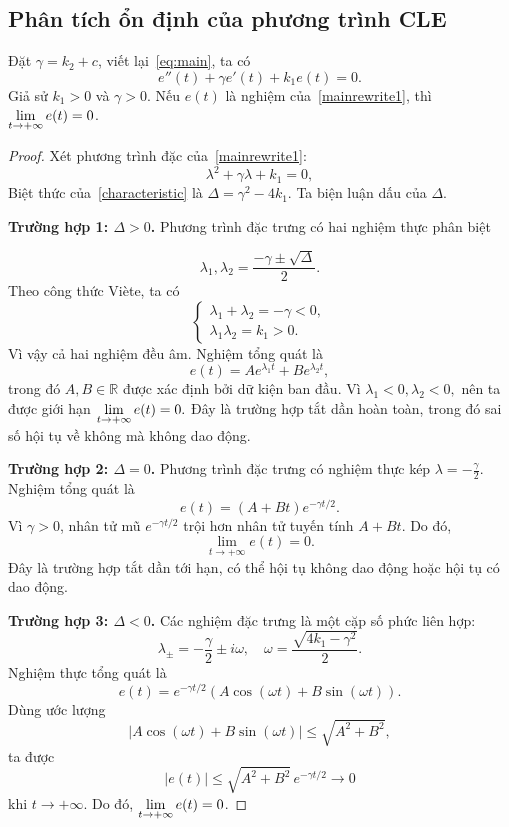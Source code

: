 ﻿\documentclass[12pt]{article}
\begin{document}
\subsection{Phân tích ổn định của phương trình CLE}
\begin{theorem}
  
Đặt $\gamma = k_2 + c$, viết lại~\eqref{eq:main}, ta có
\begin{equation}\label{mainrewrite1}
 e''(t) + \gamma e'(t) + k_1 e(t) = 0.
\end{equation}
Giả sử $k_1 > 0$ và $\gamma > 0$. Nếu $e(t)$ là nghiệm của~\eqref{mainrewrite1}, thì $\displaystyle \lim_{t \to + \infty} e(t) = 0$.
\end{theorem}
\begin{proof} Xét phương trình đặc của~\eqref{mainrewrite1}:
\begin{equation}\label{characteristic}
 \lambda^2 + \gamma\lambda + k_1 = 0,
\end{equation}
Biệt thức của~\eqref{characteristic} là
$\Delta = \gamma^2 - 4k_1.$
Ta biện luận dấu của $\Delta$.

\textbf{Trường hợp 1: $\Delta > 0$.} Phương trình đặc trưng có hai nghiệm thực phân biệt

\[
 \lambda_1,\lambda_2 = \frac{-\gamma \pm \sqrt{\Delta}}{2}.
\]
Theo công thức Viète, ta có
\[
 \begin{cases}
 \lambda_1 + \lambda_2 = -\gamma < 0,\\
 \lambda_1\lambda_2 = k_1 > 0.
 \end{cases}
\]
Vì vậy cả hai nghiệm đều âm. Nghiệm tổng quát là
\[
 e(t) = Ae^{\lambda_1 t} + Be^{\lambda_2 t},
\]
trong đó $A, B \in \mathbb R$ được xác định bởi dữ kiện ban đầu. Vì
$\lambda_1 < 0,\lambda_2 < 0,$ nên ta được giới hạn
$\displaystyle \lim_{t \to + \infty} e(t) = 0.$
Đây là trường hợp tắt dần hoàn toàn, trong đó sai số hội tụ về không mà không dao động.

\textbf{Trường hợp 2: $\Delta = 0$.} Phương trình đặc trưng có nghiệm thực kép
$\lambda = -\frac{\gamma}{2}.$ Nghiệm tổng quát là
\[
 e(t) = (A + Bt)e^{-\gamma t/2}.
\]
Vì $\gamma > 0$, nhân tử mũ $e^{-\gamma t/2}$ trội hơn nhân tử tuyến tính $A + Bt$. Do đó,
\[
 \lim_{t \to + \infty} e(t) = 0.
\]
Đây là trường hợp tắt dần tới hạn, có thể hội tụ không dao động hoặc hội tụ có dao động.

\textbf{Trường hợp 3: $\Delta < 0$.} Các nghiệm đặc trưng là một cặp số phức liên hợp:
\[
 \lambda_{\pm} = -\frac{\gamma}{2} \pm i\omega,\quad \omega = \frac{\sqrt{4k_1 - \gamma^2}}{2}.
\]
Nghiệm thực tổng quát là
\[
 e(t) = e^{-\gamma t/2} \left( A\cos(\omega t) + B\sin(\omega t) \right).
\]
Dùng ước lượng
\[
 \left|A\cos(\omega t) + B\sin(\omega t)\right| \leq \sqrt{A^2 + B^2},
\]
ta được
\[
 |e(t)| \leq \sqrt{A^2 + B^2}\, e^{-\gamma t/2} \to 0
\]
khi $t \to + \infty$. Do đó, $\displaystyle \lim_{t \to + \infty} e(t) = 0$.
\end{proof}
\end{document}

